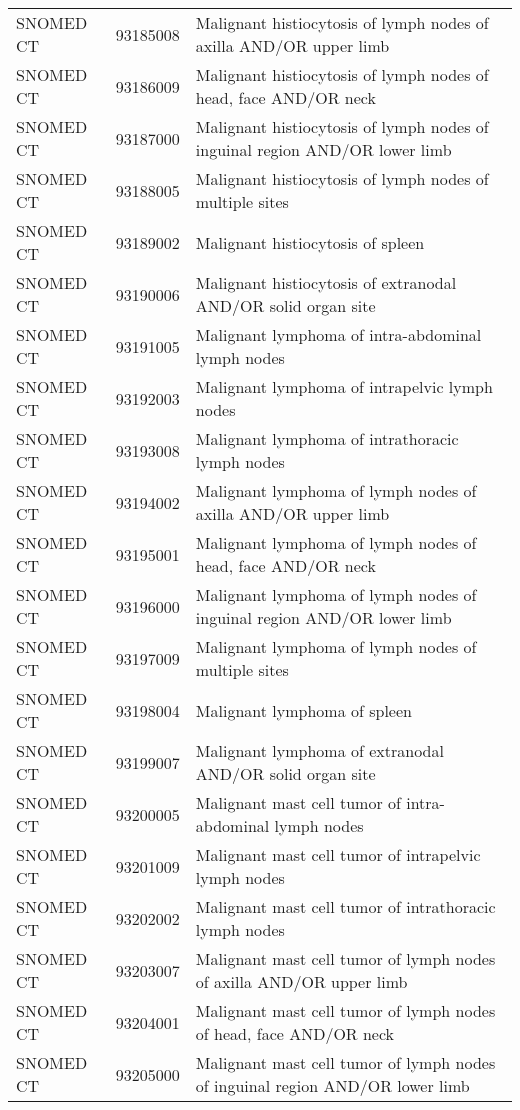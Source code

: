 \begin{longtable}{p{}p{}p{}}
  SNOMED CT & 93185008 & Malignant histiocytosis of lymph nodes of axilla AND/OR upper limb \\ 
  SNOMED CT & 93186009 & Malignant histiocytosis of lymph nodes of head, face AND/OR neck \\ 
  SNOMED CT & 93187000 & Malignant histiocytosis of lymph nodes of inguinal region AND/OR lower limb \\ 
  SNOMED CT & 93188005 & Malignant histiocytosis of lymph nodes of multiple sites \\ 
  SNOMED CT & 93189002 & Malignant histiocytosis of spleen \\ 
  SNOMED CT & 93190006 & Malignant histiocytosis of extranodal AND/OR solid organ site \\ 
  SNOMED CT & 93191005 & Malignant lymphoma of intra-abdominal lymph nodes \\ 
  SNOMED CT & 93192003 & Malignant lymphoma of intrapelvic lymph nodes \\ 
  SNOMED CT & 93193008 & Malignant lymphoma of intrathoracic lymph nodes \\ 
  SNOMED CT & 93194002 & Malignant lymphoma of lymph nodes of axilla AND/OR upper limb \\ 
  SNOMED CT & 93195001 & Malignant lymphoma of lymph nodes of head, face AND/OR neck \\ 
  SNOMED CT & 93196000 & Malignant lymphoma of lymph nodes of inguinal region AND/OR lower limb \\ 
  SNOMED CT & 93197009 & Malignant lymphoma of lymph nodes of multiple sites \\ 
  SNOMED CT & 93198004 & Malignant lymphoma of spleen \\ 
  SNOMED CT & 93199007 & Malignant lymphoma of extranodal AND/OR solid organ site \\ 
  SNOMED CT & 93200005 & Malignant mast cell tumor of intra-abdominal lymph nodes \\ 
  SNOMED CT & 93201009 & Malignant mast cell tumor of intrapelvic lymph nodes \\ 
  SNOMED CT & 93202002 & Malignant mast cell tumor of intrathoracic lymph nodes \\ 
  SNOMED CT & 93203007 & Malignant mast cell tumor of lymph nodes of axilla AND/OR upper limb \\ 
  SNOMED CT & 93204001 & Malignant mast cell tumor of lymph nodes of head, face AND/OR neck \\ 
  SNOMED CT & 93205000 & Malignant mast cell tumor of lymph nodes of inguinal region AND/OR lower limb \\ 

\end{longtable}
